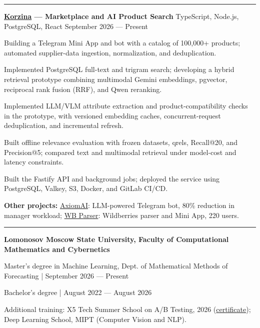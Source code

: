 \documentclass[10pt,a4paper]{article}
\newcommand{\cvsection}[1]{%
  \vspace{5pt}{\large\bfseries #1}\par\vspace{2pt}\hrule\vspace{3pt}}
\newcommand{\cventry}[3]{%
  \textbf{#1} \textbar{} #3 \textbar{} #2\par\vspace{1pt}}
\begin{document}
\cvsection{Projects}
\cventry{\href{https://github.com/noobmaster-ru/korzina-market}{Korzina} --- Marketplace and AI Product Search}{September 2026 --- Present}{TypeScript, Node.js, PostgreSQL, React}
\begin{cvitems}
    \item Building a Telegram Mini App and bot with a catalog of 100,000+ products; automated supplier-data ingestion, normalization, and deduplication.
    \item Implemented PostgreSQL full-text and trigram search; developing a hybrid retrieval prototype combining multimodal Gemini embeddings, pgvector, reciprocal rank fusion (RRF), and Qwen reranking.
    \item Implemented LLM/VLM attribute extraction and product-compatibility checks in the prototype, with versioned embedding caches, concurrent-request deduplication, and incremental refresh.
    \item Built offline relevance evaluation with frozen datasets, qrels, Recall@20, and Precision@5; compared text and multimodal retrieval under model-cost and latency constraints.
    \item Built the Fastify API and background jobs; deployed the service using PostgreSQL, Valkey, S3, Docker, and GitLab CI/CD.
\end{cvitems}
\textbf{Other projects:} \href{https://github.com/noobmaster-ru/axiomai}{AxiomAI}: LLM-powered Telegram bot, 80\% reduction in manager workload; \href{https://github.com/noobmaster-ru/tg-mini-app-backend}{WB Parser}: Wildberries parser and Mini App, 220 users.\par

\cvsection{Education}
\textbf{Lomonosov Moscow State University, Faculty of Computational Mathematics and Cybernetics}\par
Master's degree in Machine Learning, Dept. of Mathematical Methods of Forecasting | September 2026 --- Present\par
Bachelor's degree | August 2022 --- August 2026\par
Additional training: X5 Tech Summer School on A/B Testing, 2026 (\href{https://drive.google.com/file/d/1mUnPwkYkO6VxMJelwePo0Ie6PKA6IBot/view?usp=sharing}{certificate}); Deep Learning School, MIPT (Computer Vision and NLP).
\end{document}
